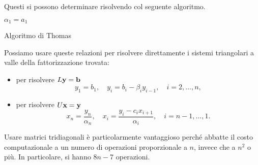 Questi si possono determinare risolvendo col seguente algoritmo. \\

\begin{algo}
    $\alpha _{1} =a_{1}$\;
    \caption{Algoritmo di Thomas}
\end{algo}
Possiamo usare queste relazioni per risolvere direttamente i sistemi triangolari a valle della fattorizzazione trovata:
\begin{itemize}
\item per risolvere $L\mathbf{y} =\mathbf{b}$
\begin{equation*}
y_{1} =b_{1} ,\quad y_{i} =b_{i} -\beta _{i} y_{i-1} ,\quad i=2,\dotsc ,n,
\end{equation*}
\item per risolvere $U\mathbf{x} =\mathbf{y}$
\begin{equation*}
x_{n} =\frac{y_{n}}{\alpha _{n}} ,\quad x_{i} =\frac{y_{i} -c_{i} x_{i+1}}{\alpha _{i}} ,\quad i=n-1,\dotsc ,1.
\end{equation*}
\end{itemize}

Usare matrici tridiagonali è particolarmente vantaggioso perché abbatte il costo computazionale a un numero di operazioni proporzionale a $n$, invece che a $n^2$ o più.
In particolare, si hanno $8n-7$ operazioni.

